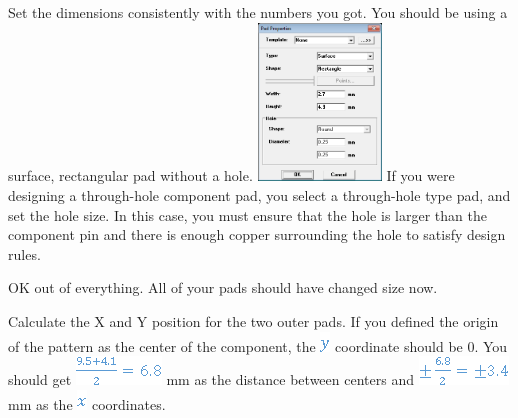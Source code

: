 \documentclass[letterpaper]{article}
\begin{document}
{\sffamily\color[rgb]{0.30980393,0.5058824,0.7411765}
Set the dimensions consistently with the numbers you got. You should be using a surface, rectangular pad without a
hole.\newline
 \includegraphics[width=1.2957in,height=1.6543in]{figures/ee4document-img033.png} \newline
If you were designing a through-hole component pad, you select a through-hole type pad, and set the hole size. In this
case, you must ensure that the hole is larger than the component pin and there is enough copper surrounding the hole to
satisfy design rules.}

{\sffamily\color[rgb]{0.30980393,0.5058824,0.7411765}
OK out of everything. All of your pads should have changed size now.}

{\sffamily\color[rgb]{0.30980393,0.5058824,0.7411765}
Calculate the X and Y position for the two outer pads. If you defined the origin of the pattern as the center of the
component, the  \includegraphics[width=0.1043in,height=0.2083in]{figures/ee4document-img034.png}  coordinate should be
0.\newline
You should get  \includegraphics[width=0.8957in,height=0.302in]{figures/ee4document-img035.png}  mm as the distance between
centers and  \includegraphics[width=0.9374in,height=0.302in]{figures/ee4document-img036.png}  mm as the 
\includegraphics[width=0.1043in,height=0.2083in]{figures/ee4document-img037.png}  coordinates.}
\end{document}
